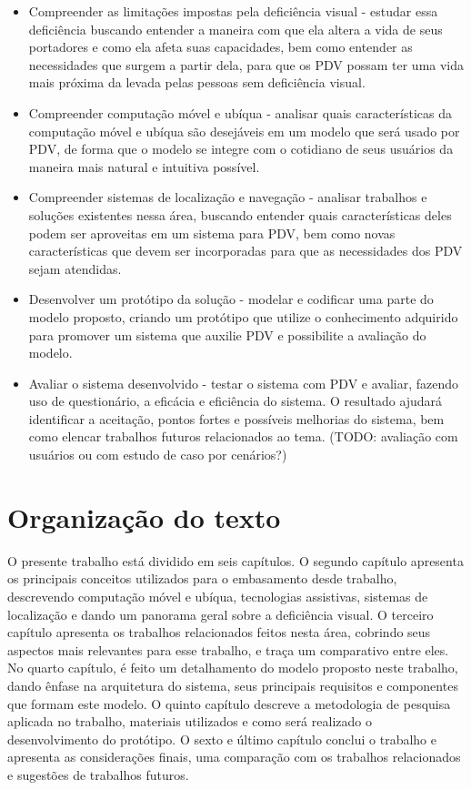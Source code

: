 \documentclass[english,brazilian]{UNISINOSmonografia}
\begin{document}
		\begin{itemize} %
			\item Compreender as limitações impostas pela deficiência visual - estudar essa deficiência buscando entender a maneira com que ela altera a vida de seus portadores e como ela afeta suas capacidades, bem como entender as necessidades que surgem a partir dela, para que os PDV possam ter uma vida mais próxima da levada pelas pessoas sem deficiência visual. 

			\item Compreender computação móvel e ubíqua - analisar quais características da computação móvel e ubíqua são desejáveis em um modelo que será usado por PDV, de forma que o modelo se integre com o cotidiano de seus usuários da maneira mais natural e intuitiva possível.

			\item Compreender sistemas de localização e navegação - analisar trabalhos e soluções existentes nessa área, buscando entender quais características deles podem ser aproveitas em um sistema para PDV, bem como novas características que devem ser incorporadas para que as necessidades dos PDV sejam atendidas.

			\item Desenvolver um protótipo da solução - modelar e codificar uma parte do modelo proposto, criando um protótipo que utilize o conhecimento adquirido para promover um sistema que auxilie PDV e possibilite a avaliação do modelo.

			\item Avaliar o sistema desenvolvido - testar o sistema com PDV e avaliar, fazendo uso de questionário, a eficácia e eficiência do sistema. O resultado ajudará identificar a aceitação, pontos fortes e possíveis melhorias do sistema, bem como elencar trabalhos futuros relacionados ao tema. (TODO: avaliação com usuários ou com estudo de caso por cenários?) 
		\end{itemize}

	\section{Organização do texto}
O presente trabalho está dividido em seis capítulos. 
O segundo capítulo apresenta os principais conceitos utilizados para o embasamento desde trabalho, descrevendo computação móvel e ubíqua, tecnologias assistivas, sistemas de localização e dando um panorama geral sobre a deficiência visual.
O terceiro capítulo apresenta os trabalhos relacionados feitos nesta área, cobrindo seus aspectos mais relevantes para esse trabalho, e traça um comparativo entre eles.
No quarto capítulo, é feito um detalhamento do modelo proposto neste trabalho, dando ênfase na arquitetura do sistema, seus principais requisitos e componentes que formam este modelo.
O quinto capítulo descreve a metodologia de pesquisa aplicada no trabalho, materiais utilizados e como será realizado o desenvolvimento do protótipo.
O sexto e último capítulo conclui o trabalho e apresenta as considerações finais, uma comparação com os trabalhos relacionados e sugestões de trabalhos futuros.
\end{document}
